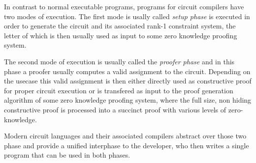 In contrast to normal executable programs, programs for circuit compilers have two modes of execution. The first mode is usally called \textit{setup phase} is executed in order to generate the circuit and its associated rank-1 constraint system, the letter of which is then usually used as input to some zero knowledge proofing system.

The second mode of execution is usually called the \textit{proofer phase} and in this phase a proofer usually computes a valid assignment to the circuit. Depending on the usecase this valid assignment is then either directly used as constructive proof for proper circuit execution or is transfered as input to the proof generation algorithm of some zero knowledge proofing system, where the full size, non hiding constructive proof is processed into a succinct proof with various levels of zero-knowledge.

Modern circuit languages and their associated compilers abstract over those two phase and provide a unified interphase to the developer, who then writes a single program that can be used in both phases. 


